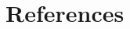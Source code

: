 \documentclass[10pt,a4paper]{article}
\begin{document}
\section{References}
 
\begin{thebibliography}{9}

\end{thebibliography}













\begin{comment}

$$
\begin{bmatrix}
0 & 0 & 0 & 0 \\
0 & 0 & 0 & 0 \\
0 & 0 & 0 & 0 \\
0 & 0 & 0 & 0 \\
\end{bmatrix}
$$

\begin{lstlisting}[caption=insert caption]
for (unsigned int i = 0; i<100;i++{
}
\end{lstlisting}

\begin{figure}[h]
\texttt{[image: ]}
\caption{include caption}
\end{figure}


HOW TO CITE SOURCES:
use
\cite{reference name}
in the text, and
\bibitem{reference name} 



\end{comment}
\end{document}
